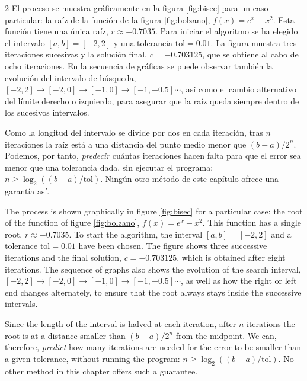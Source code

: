 \begin{paracol}{2}
El proceso se muestra gráficamente en la figura \ref{fig:bisec} para un caso particular: la raíz de la función de la figura \ref{fig:bolzano}, $f(x)=e^x-x^2$. Esta función tiene una única raíz, $r\approx -0.7035$. Para iniciar el algoritmo se ha elegido el intervalo $[a,b]=[-2,2]$ y una tolerancia $\text{tol}=0.01$. La figura muestra tres iteraciones sucesivas y la solución final, $c=-0.703125$, que se obtiene al cabo de ocho iteraciones. En la secuencia de gráficas se puede observar también la evolución del intervalo de búsqueda, $[-2, 2]\rightarrow [-2, 0] \rightarrow [-1, 0] \rightarrow [-1, -0.5] \cdots$, así como el cambio alternativo del límite derecho o izquierdo, para asegurar que la raíz queda siempre dentro de los sucesivos intervalos.

Como la longitud del intervalo se divide por dos en cada iteración, tras $n$ iteraciones la raíz está a una distancia del punto medio menor que $(b-a)/2^{n}$. Podemos, por tanto, \emph{predecir} cuántas iteraciones hacen falta para que el error sea menor que una tolerancia dada, sin ejecutar el programa: $n\geq\log_2\left((b-a)/\text{tol}\right)$. Ningún otro método de este capítulo ofrece una garantía así.

\switchcolumn

The process is shown graphically in figure \ref{fig:bisec} for a particular case: the root of the function of figure \ref{fig:bolzano}, $f(x)=e^x-x^2$. This function has a single root, $r\approx -0.7035$. To start the algorithm, the interval $[a,b]=[-2,2]$ and a tolerance $\text{tol}=0.01$ have been chosen. The figure shows three successive iterations and the final solution, $c=-0.703125$, which is obtained after eight iterations. The sequence of graphs also shows the evolution of the search interval, $[-2, 2]\rightarrow [-2, 0] \rightarrow [-1, 0] \rightarrow [-1, -0.5] \cdots$, as well as how the right or left end changes alternately, to ensure that the root always stays inside the successive intervals.

Since the length of the interval is halved at each iteration, after $n$ iterations the root is at a distance smaller than $(b-a)/2^{n}$ from the midpoint. We can, therefore, \emph{predict} how many iterations are needed for the error to be smaller than a given tolerance, without running the program: $n\geq\log_2\left((b-a)/\text{tol}\right)$. No other method in this chapter offers such a guarantee.

\switchcolumn



\end{paracol}
